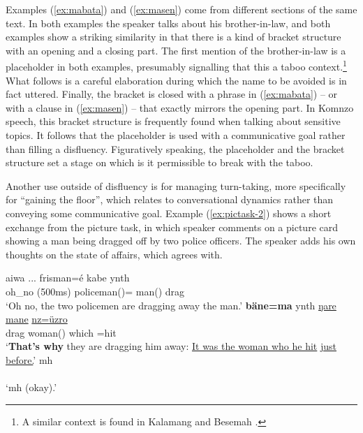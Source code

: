 \documentclass[output=paper,colorlinks,citecolor=brown]{langscibook}
\begin{document}
Examples (\ref{ex:mabata}) and (\ref{ex:masen}) come from different sections of the same text. In both examples the speaker talks about his brother-in-law, and both examples show a striking similarity in that there is a kind of bracket structure with an opening and a closing part. The first mention of the brother-in-law is a placeholder in both examples, presumably signalling that this a taboo context.\footnote{A similar context is found in Kalamang \citep{chapters/visser} and Besemah \citep{chapters/mcdonnell_billings}.} What follows is a careful elaboration during which the name to be avoided is in fact uttered. Finally, the bracket is closed with a phrase in (\ref{ex:mabata}) -- or with a clause in (\ref{ex:masen}) -- that exactly mirrors the opening part. In Komnzo speech, this bracket structure is frequently found when talking about sensitive topics. It follows that the placeholder is used with a communicative goal rather than filling a disfluency. Figuratively speaking, the placeholder and the bracket structure set a stage on which is it permissible to break with the taboo. 

Another use outside of disfluency is for managing turn-taking, more specifically for ``gaining the floor'', which relates to conversational dynamics rather than conveying some communicative goal. Example (\ref{ex:pictask-2}) shows a short exchange from the picture task, in which speaker  comments on a picture card showing a man being dragged off by two police officers. The speaker  adds his own thoughts on the state of affairs, which  agrees with.

\ea \label{ex:pictask-2}
     \label{ex:pictask-2a}
        \hspace*{-.5em}\gll aiwa ... frisman=é kabe ynth\\
        oh\_no (500ms) policeman()= man() drag\\
        \glt `Oh no, the two policemen are dragging away the man.' 
     \label{ex:pictask-2b}
        \hspace*{-.25em}\gll \textbf{bäne=ma} ynth \uline{ŋare} \uline{mane} \uline{nz=üzro}\\
         drag woman() which =hit\\
        \glt `\textbf{That's why} they are dragging him away: \uline{It was the woman who he hit} \uline{just before.}' 
     \label{ex:pictask-2c}
        \hspace*{-.5em}\gll mh\\
        \\
        \glt `mh (okay).' 
\z
\end{document}
